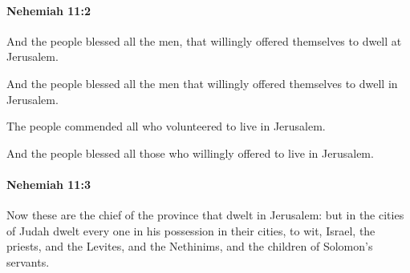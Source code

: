 		\paragraph{Nehemiah 11:2} %
			\label{NEHEMIAH-11-2}

			And the people blessed all the men, that willingly offered themselves to dwell at Jerusalem.

			\begin{versebox}
					\item[BHS] 
					\item[LXX] 
					\item[ASV] And the people blessed all the men that willingly offered themselves to dwell in Jerusalem.
					\item[NIV] The people commended all who volunteered to live in Jerusalem.
					\item[NRSV] And the people blessed all those who willingly offered to live in Jerusalem.
			\end{versebox}

		\paragraph{Nehemiah 11:3} %
			\label{NEHEMIAH-11-3}

			Now these are the chief of the province that dwelt in Jerusalem: but in the cities of Judah dwelt every one in his possession in their cities, to wit, Israel, the priests, and the Levites, and the Nethinims, and the children of Solomon’s servants.

